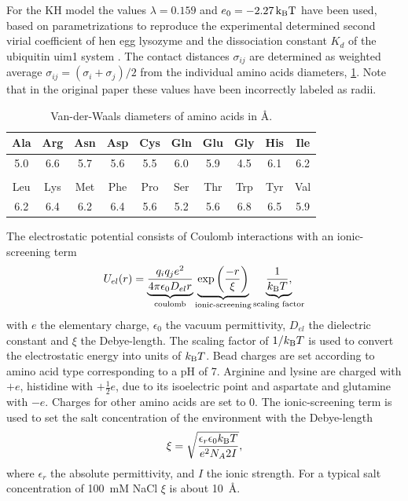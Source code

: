 \documentclass[12pt, twoside]{report}
\begin{document}
For the \gls{KH} model the values \(\lambda=0.159\) and \(e_0=\SI{-2.27}{k_{\mathrm{B}}T}\)
have been used, based on parametrizations to reproduce the experimental
determined second virial coefficient of hen egg lysozyme and the dissociation
constant \(K_d\) of the ubiquitin uim1 system \cite{Kim2008}. The contact
distances \(\sigma_{ij}\) are determined as weighted average \(\sigma_{ij} =
(\sigma_i + \sigma_j) / 2\) from the individual amino acids diameters,
\cref{tab:radii}. Note that in the original paper these values have been
incorrectly labeled as radii.
\begin{table}[!htb]
  \centering
  \begin{tabular}{c c c c c c c c c c}
    Ala&Arg&Asn&Asp&Cys&Gln&Glu&Gly&His&Ile \\
    \hline
    5.0&6.6&5.7&5.6&5.5&6.0&5.9&4.5&6.1&6.2 \\
    \\
    Leu&Lys&Met&Phe&Pro&Ser&Thr&Trp&Tyr&Val \\
    \hline
    6.2&6.4&6.2&6.4&5.6&5.2&5.6&6.8&6.5&5.9
  \end{tabular}
  \caption{Van-der-Waals diameters of amino acids in
    \AA\cite{Kim2008}.\label{tab:radii}}
\end{table}

The electrostatic potential consists of Coulomb interactions with an
ionic-screening term
\begin{align}
  \label{eq:ch5:complexesDH}
  U_{el}(r) = \underbrace{\frac{q_i q_j e^2}{4 \pi \epsilon_0 D_{el} r}}_{\text{coulomb}} \underbrace{\exp\left(\frac{-r}{\xi}\right)}_{\text{ionic-screening}} \underbrace{\frac{1}{k_{\mathrm{B}}T},}_{\text{scaling factor}}
\end{align}
with $e$ the elementary charge, $\epsilon_0$ the vacuum permittivity, $D_{el}$
the dielectric constant and \(\xi\) the Debye-length. The scaling factor of
\(1/k_{\mathrm{B}}T\) is used to convert the electrostatic energy into units of \(k_{\mathrm{B}}T\).
Bead charges are set according to amino acid type corresponding to a pH of 7.
Arginine and lysine are charged with $+e$, histidine with $+\frac{1}{2}e$, due
to its isoelectric point and aspartate and glutamine with $-e$. Charges for
other amino acids are set to 0. The ionic-screening term is used to set the salt
concentration of the environment with the Debye-length
\begin{align}
  \xi = \sqrt{\frac{\epsilon_r \epsilon_0 k_{\mathrm{B}}T}{e^2 N_A 2 I}},
\end{align}
where \(\epsilon_r\) the absolute permittivity, and \(I\) the ionic strength.
For a typical salt concentration of \SI{100}{mM} NaCl \(\xi \) is about
\SI{10}{\angstrom}.
\end{document}
